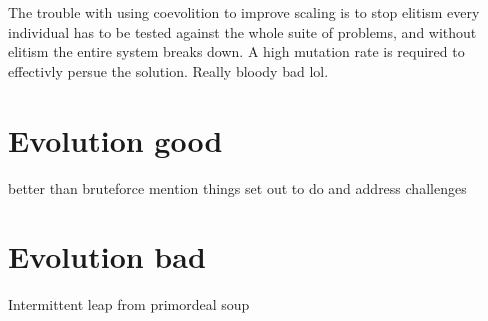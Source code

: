 The trouble with using coevolition to improve scaling is to stop elitism
every individual has to be tested against the whole suite of problems, and
without elitism the entire system breaks down. A high mutation rate is required
to effectivly persue the solution. Really bloody bad lol.

\section{Evolution good}
better than bruteforce
mention things set out to do and address challenges

\section{Evolution bad}
Intermittent leap from primordeal soup

